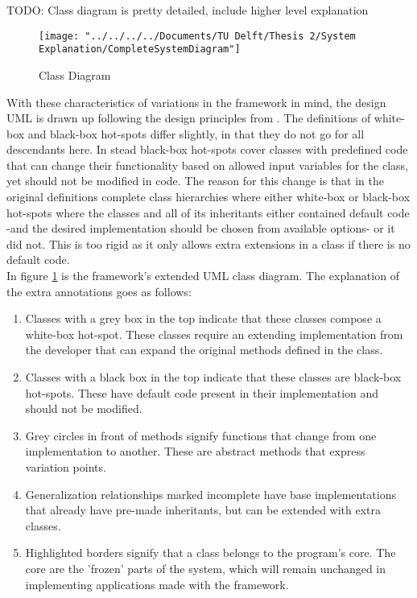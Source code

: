 TODO: Class diagram is pretty detailed, include higher level explanation
\begin{figure}
	\centering
	\texttt{[image: "../../../../Documents/TU Delft/Thesis 2/System Explanation/CompleteSystemDiagram"]}
	\caption[Complete System Class Diagram]{Class Diagram}
	\label{fig:completesystemdiagram}
\end{figure}

With these characteristics of variations in the framework in mind, the design UML is drawn up following the design principles from \citet{bouassida2001uml}. The definitions of white-box and black-box hot-spots differ slightly, in that they do not go for all descendants here. In stead black-box hot-spots cover classes with predefined code that can change their functionality based on allowed input variables for the class, yet should not be modified in code. The reason for this change is that in the original definitions complete class hierarchies where either white-box or black-box hot-spots where the classes and all of its inheritants either contained default code -and the desired implementation should be chosen from available options- or it did not. This is too rigid as it only allows extra extensions in a class if there is no default code.\\

In figure \ref{fig:completesystemdiagram} is the framework's extended UML class diagram. The explanation of the extra annotations goes as follows:

\begin{enumerate}
	\item Classes with a grey box in the top indicate that these classes  compose a white-box hot-spot. These classes require an extending implementation from the developer that can expand the original methods defined in the class.
	\item Classes with a black box in the top indicate that these classes are black-box hot-spots. These have default code present in their implementation and should not be modified.
	\item Grey circles in front of methods signify functions that change from one implementation to another. These are abstract methods that express variation points.
	\item Generalization relationships marked {incomplete} have base implementations that already have pre-made inheritants, but can be extended with extra classes.
	\item Highlighted borders signify that a class belongs to the program's core. The core are the 'frozen' parts of the system, which will remain unchanged in implementing applications made with the framework.
\end{enumerate}


